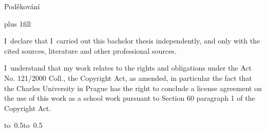 \documentclass[12pt,a4paper,fleqn]{report}
\let\openright=\clearpage
\begin{document}
\newpage


\openright

\noindent
Poděkování



\vglue 0pt plus 1fill

\noindent
I~declare that I~carried out this bachelor thesis independently, and only with
the cited sources, literature and other professional sources.

\medskip\noindent
I~understand that my work relates to the rights and obligations under the Act
No. 121/2000 Coll., the Copyright Act, as amended, in particular the fact that
the Charles University in Prague has the right to conclude a license agreement
on the use of this work as a school work pursuant to Section 60 paragraph 1 of
the Copyright Act.

\vspace{10mm}

\hbox{\hbox to 0.5\hbox to 0.5}

\vspace{20mm}
\newpage

\end{document}
